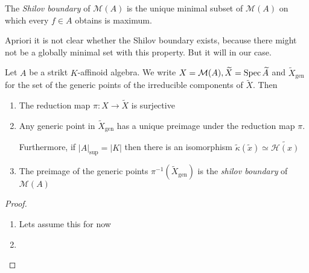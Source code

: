 \begin{definition}
	The \emph{Shilov boundary} of $\mathcal{M}(A)$ is the unique minimal subset of $\mathcal{M} (A)$ on which every $f \in A$ obtains is maximum. 
\end{definition}
Apriori it is not clear whether the Shilov boundary exists, because there might not be a globally minimal set with this property. But it will in our case. 

\begin{proposition}
	Let $A$ be a strikt $K$-affinoid algebra. We write $X = \mathcal{M} (A), \widetilde X = \operatorname{Spec} \widetilde A$ and $\widetilde X _\text{gen} $ for the set of the generic points of the irreducible components of $\widetilde X$. 
	Then 
	\begin{enumerate}
		\item The reduction map $\pi: X \to \widetilde X$ is surjective
		\item Any generic point in $\widetilde X _\text{gen} $ has a unique preimage under the reduction map $\pi$. 

		Furthermore, if $|A|_\text{sup}  = |K|$ then there is an isomorphism $\tilde \kappa(\widetilde x) \simeq \widetilde{\mathcal{H} (x)}$

	\item The preimage of the generic points $\pi^{-1}(\widetilde X_\text{gen} )$ is the \emph{shilov boundary} of $\mathcal{M} (A)$ 
	\end{enumerate}
\end{proposition}

\begin{proof}
\begin{enumerate}
	\item Lets assume this for now 

	\item 
\end{enumerate}	
\end{proof}
	
